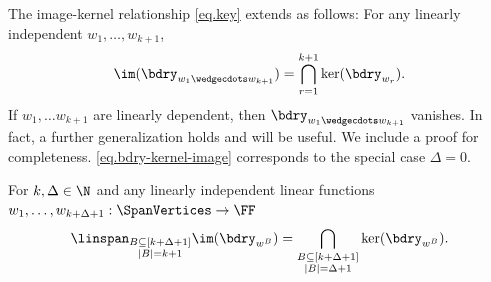 The image-kernel relationship \eqref{eq.key} extends as follows: For any linearly independent $w_1, \dots, w_{k+1}$,
\begin{equation}
  \label{eq.bdry-kernel-image}
\im(\bdry_{w_1 \wedgecdots w_{k+1}}) = 
\bigcap_{r=1}^{k+1} \ker(\bdry_{w_r}).
\end{equation}
If $w_1, \dots w_{k+1}$ are linearly dependent, then $\bdry_{w_1 \wedgecdots w_{k+1}}$ vanishes. In fact, a further generalization holds and will be useful. We include a proof for completeness. \eqref{eq.bdry-kernel-image} corresponds to the special case $\Delta=0$.
\begin{proposition}
    \label{prop.bdry-multiple-kernel-image}
    For $k, \Delta \in \N$ and any linearly independent linear functions $w_1,\dots,w_{k+\Delta+1}: \SpanVertices \to \FF$
    \begin{equation}\label{eq.bdry-kernel-image.general}
    \linspan_{\substack{B \subseteq [k+\Delta+1]\\ |B|=k+1}}\im(\bdry_{w^B}) = 
    \bigcap_{\substack{B \subseteq [k+\Delta+1] \\ |B|=\Delta+1}}
    \ker(\bdry_{w^B}). 
    \end{equation}
\end{proposition}
